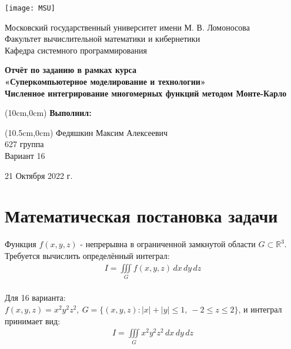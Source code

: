 \documentclass[12pt, a4paper ]{article}
\begin{document}
\begin{titlepage}
 \begin{center}
    \texttt{[image: MSU]}
 \end{center}
 \begin{center}
Московский государственный университет имени М. В. Ломоносова \\
Факультет вычислительной математики и кибернетики \\
Кафедра системного программирования \\
\end{center}
\vspace{7em}
\begin{center}
\Large \textbf {Отчёт по заданию в рамках курса \\
«Суперкомпьютерное моделирование и технологии» \\
Численное интегрирование многомерных функций
методом Монте-Карло} 
\end{center}
\vspace{4em}
\begin{textblock*}{\textwidth}(10cm,0cm)
\large \textbf { Выполнил:} \\
\end{textblock*}
\vspace{1.8em}
\begin{textblock*}{\textwidth}(10.5cm,0cm)
\large Федяшкин Максим Алексеевич \\
\large 627 группа\\
\large Вариант 16
\end{textblock*}
\vspace*{\fill}
 \begin{center}
  21 Октября 2022 г.
\end{center}
\end{titlepage}
\section{\large Математическая постановка задачи}
Функция \(f(x, y, z)\) - непрерывна в ограниченной замкнутой области $G \subset \mathbb{R}^3$. Требуется вычислить определённый интеграл:\\
\begin{gather}
  I = \iiint\limits_G f(x, y, z) \,dx\,dy\,dz
\end{gather}\\
Для 16 варианта:~~$f(x, y, z) = x^2y^2z^2,~G = \{ (x, y, z) : |x| + |y| \leq 1,~ -2 \leq z \leq 2 \} $, и интеграл принимает вид:
\begin{gather}
  I = \iiint\limits_G  x^2y^2z^2 \,dx\,dy\,dz
\end{gather}
\end{document}
